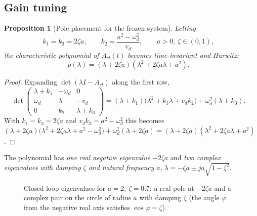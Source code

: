 \documentclass[11pt,a4paper]{article}
\def\bm#1{#1}%
\def\vect#1{#1}%
\newcommand{\vect}[1]{\bm{#1}}
\newcommand{\vd}{v_d}
\newcommand{\omd}{\omega_d}
\newcommand{\Acl}{\vect{A}_{cl}}
\theoremstyle{definition}
\theoremstyle{plain}
\newtheorem{proposition}[definition]{Proposition}
\theoremstyle{remark}
\begin{document}
\subsection{Gain tuning}

\begin{proposition}[Pole placement for the frozen system]\label{prop:poles}
Letting
\[
k_1=k_3=2\zeta a,\qquad k_2=\frac{a^2-\omd^2}{\vd},\qquad a>0,\ \zeta\in(0,1),
\]
the characteristic polynomial of $\Acl(t)$ becomes time-invariant and Hurwitz:
\[
p(\lambda)=(\lambda+2\zeta a)(\lambda^2+2\zeta a\lambda+a^2).
\]
\end{proposition}
\begin{proof}
Expanding $\det(\lambda\vect I-\Acl)$ along the first row,
\[
\det\begin{pmatrix}\lambda+k_1&-\omd&0\\\omd&\lambda&-\vd\\0&k_2&\lambda+k_3\end{pmatrix}
=(\lambda+k_1)\bigl(\lambda^2+k_3\lambda+\vd k_2\bigr)+\omd^2(\lambda+k_3).
\]
With $k_1=k_3=2\zeta a$ and $\vd k_2=a^2-\omd^2$ this becomes $(\lambda+2\zeta a)\bigl(\lambda^2+2\zeta a\lambda+a^2-\omd^2\bigr)+\omd^2(\lambda+2\zeta a)=(\lambda+2\zeta a)(\lambda^2+2\zeta a\lambda+a^2)$.
\end{proof}

The polynomial has \emph{one real negative eigenvalue} $-2\zeta a$ and \emph{two complex eigenvalues with damping $\zeta$ and natural frequency $a$}, $\lambda=-\zeta a\pm ja\sqrt{1-\zeta^2}$.

\begin{figure}[H]
\centering
{}
\caption{Closed-loop eigenvalues for $a=2,\ \zeta=0.7$: a real pole at $-2\zeta a$ and a complex pair on the circle of radius $a$ with damping $\zeta$ (the angle $\varphi$ from the negative real axis satisfies $\cos\varphi=\zeta$).}
\end{figure}
\end{document}
